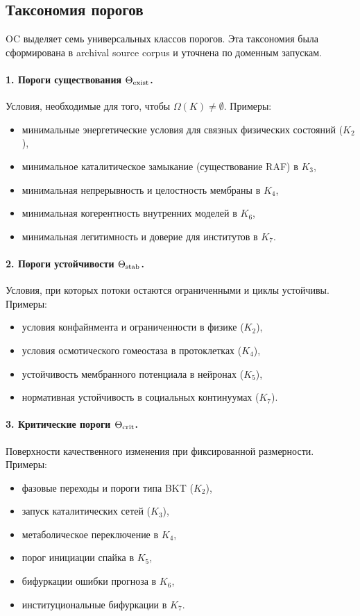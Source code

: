 \subsection{Таксономия порогов}

OC выделяет семь универсальных классов порогов. Эта таксономия была
сформирована в archival source corpus и уточнена по доменным запускам.

\paragraph{1. Пороги существования \(\Theta_{\rm exist}\).}
Условия, необходимые для того, чтобы \(\Omega(K)\neq\emptyset\).
Примеры:
\begin{itemize}
    \item минимальные энергетические условия для связных физических состояний (\(K_2\)),
    \item минимальное каталитическое замыкание (существование RAF) в \(K_3\),
    \item минимальная непрерывность и целостность мембраны в \(K_4\),
    \item минимальная когерентность внутренних моделей в \(K_6\),
    \item минимальная легитимность и доверие для институтов в \(K_7\).
\end{itemize}

\paragraph{2. Пороги устойчивости \(\Theta_{\rm stab}\).}
Условия, при которых потоки остаются ограниченными и циклы устойчивы.
Примеры:
\begin{itemize}
    \item условия конфайнмента и ограниченности в физике (\(K_2\)),
    \item условия осмотического гомеостаза в протоклетках (\(K_4\)),
    \item устойчивость мембранного потенциала в нейронах (\(K_5\)),
    \item нормативная устойчивость в социальных континуумах (\(K_7\)).
\end{itemize}

\paragraph{3. Критические пороги \(\Theta_{\rm crit}\).}
Поверхности качественного изменения при фиксированной размерности.
Примеры:
\begin{itemize}
    \item фазовые переходы и пороги типа BKT (\(K_2\)),
    \item запуск каталитических сетей (\(K_3\)),
    \item метаболическое переключение в \(K_4\),
    \item порог инициации спайка в \(K_5\),
    \item бифуркации ошибки прогноза в \(K_6\),
    \item институциональные бифуркации в \(K_7\).
\end{itemize}

